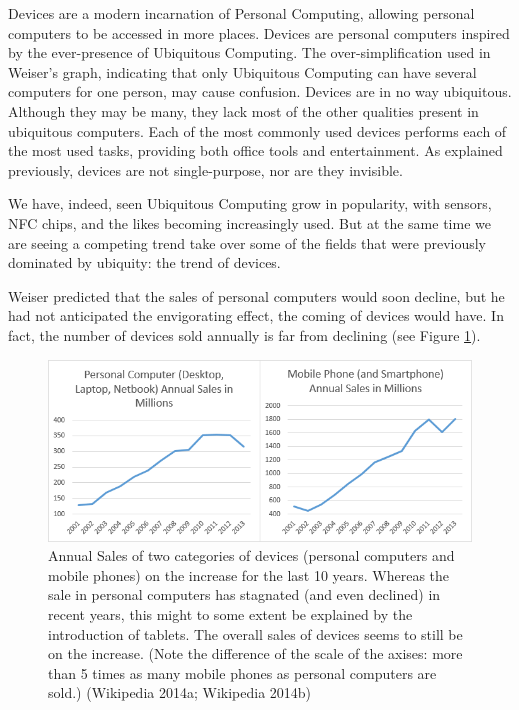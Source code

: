 Devices are a modern incarnation of Personal Computing, allowing personal computers to be accessed in more places. Devices are personal
computers inspired by the ever-presence of Ubiquitous Computing. The over-simplification used in Weiser's graph, indicating that only
Ubiquitous Computing can have several computers for one person, may cause confusion. Devices are in no way ubiquitous. Although they may
be many, they lack most of the other qualities present in ubiquitous computers. Each
of the most commonly used devices performs each of the most used tasks, providing both office tools and entertainment. As explained
previously, devices are not single-purpose, nor are they invisible.

We have, indeed, seen Ubiquitous Computing grow in popularity, with sensors, NFC chips, and the likes becoming increasingly used. But
at the same time we are seeing a competing trend take over some of the fields that were previously dominated by ubiquity: the trend of
devices.

Weiser predicted that the sales of personal computers would soon decline, but he had not anticipated the envigorating effect, the
coming of devices would have. In fact, the number of devices sold annually is far from declining (see Figure \ref{fig:actual-sales-graph}).

\begin{figure}[htb]
    \centering
    \includegraphics[width=1\textwidth]{multipurpose/actual-sales-graph}
    \caption{Annual Sales of two categories of devices (personal computers and mobile phones) on the increase for the last 10 years.
        Whereas the sale in personal computers has stagnated (and even declined) in recent years, this might to some extent be
        explained by the introduction of tablets. The overall sales of devices seems to still be on the increase. (Note the difference
        of the scale of the axises: more than 5 times as many mobile phones as personal computers are sold.) (Wikipedia 2014a; Wikipedia 2014b)\protect\footnotemark}
    \label{fig:actual-sales-graph}
\end{figure}

